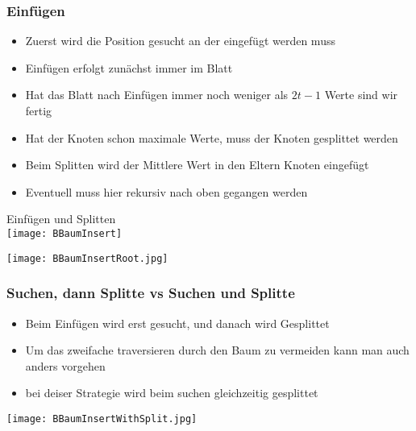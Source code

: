 		\subsubsection{Einfügen}
			\begin{itemize}
				\item Zuerst wird die Position gesucht an der eingefügt werden muss
				\item Einfügen erfolgt zunächst immer im Blatt
				\item Hat das Blatt nach Einfügen immer noch weniger als $2t - 1$ Werte sind wir fertig
				\item Hat der Knoten schon maximale Werte, muss der Knoten gesplittet werden
				\item Beim Splitten wird der Mittlere Wert in den Eltern Knoten eingefügt
				\item Eventuell muss hier rekursiv nach oben gegangen werden
			\end{itemize}

			\begin{minipage}[t]{0.5\textwidth}
				\begin{center}
					Einfügen und Splitten \\
					\texttt{[image: BBaumInsert]}
				\end{center}
			\end{minipage}
			\hspace{1cm}
			\begin{minipage}[t]{0.45\textwidth}
				\begin{center}
					\texttt{[image: BBaumInsertRoot.jpg]}
				\end{center}
			\end{minipage}


		\subsubsection{Suchen, dann Splitte vs Suchen und Splitte}
			\begin{minipage}[t]{0.5\textwidth}
				\begin{itemize}
					\item Beim Einfügen wird erst gesucht, und danach wird Gesplittet
					\item Um das zweifache traversieren durch den Baum zu vermeiden kann man 
						auch anders vorgehen
					\item bei deiser Strategie wird beim suchen gleichzeitig gesplittet
				\end{itemize}
			\end{minipage}
			\hspace{1cm}
			\begin{minipage}[t]{0.45\textwidth}
				\begin{center}
					\texttt{[image: BBaumInsertWithSplit.jpg]}
				\end{center}
			\end{minipage}


